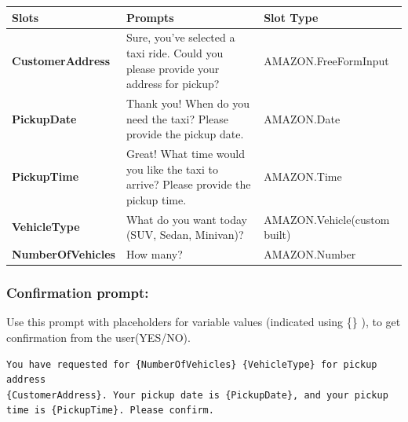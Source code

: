 \begin{table}[h]
\centering
\begin{tabular}{|>{\bfseries}m{4cm}|m{8cm}|m{5cm}|}
\hline
\textbf{Slots} & \textbf{Prompts} & \textbf{Slot Type} \\
\hline
\textbf{CustomerAddress} & Sure, you've selected a taxi ride. Could you please provide your address for pickup? & AMAZON.FreeFormInput \\
\hline
\textbf{PickupDate} & Thank you! When do you need the taxi? Please provide the pickup date. & AMAZON.Date \\
\hline
\textbf{PickupTime} & Great! What time would you like the taxi to arrive? Please provide the pickup time. & AMAZON.Time \\
\hline
\textbf{VehicleType} & What do you want today (SUV, Sedan, Minivan)? & AMAZON.Vehicle(custom built) \\
\hline
\textbf{NumberOfVehicles} & How many? & AMAZON.Number \\
\hline
\end{tabular}
\end{table}

\newpage
\subsubsection{Confirmation prompt:}
Use this prompt with placeholders for variable values (indicated using \{\} ), to get confirmation from the user(YES/NO).





\begin{lstlisting}[caption={Code snippet}]
You have requested for {NumberOfVehicles} {VehicleType} for pickup address 
{CustomerAddress}. Your pickup date is {PickupDate}, and your pickup time is {PickupTime}. Please confirm.
\end{lstlisting}

